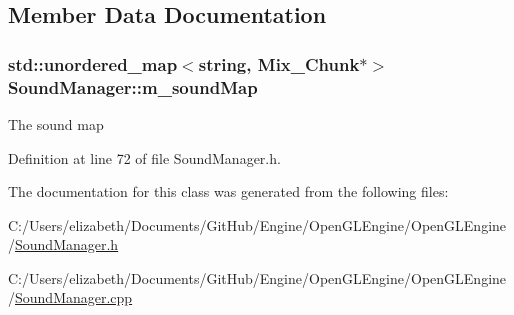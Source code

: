 \subsection{Member Data Documentation}
\subsubsection[{\texorpdfstring{m\+\_\+sound\+Map}{m_soundMap}}]{\setlength{\rightskip}{0pt plus 5cm}std\+::unordered\+\_\+map$<${\bf string}, Mix\+\_\+\+Chunk$\ast$$>$ Sound\+Manager\+::m\+\_\+sound\+Map\hspace{0.3cm}{\ttfamily [private]}}\hypertarget{class_sound_manager_a5780cd0eef57837ec5649aa0cf471224}{}\label{class_sound_manager_a5780cd0eef57837ec5649aa0cf471224}


The sound map 



Definition at line 72 of file Sound\+Manager.\+h.



The documentation for this class was generated from the following files\+:\begin{DoxyCompactItemize}
\item 
C\+:/\+Users/elizabeth/\+Documents/\+Git\+Hub/\+Engine/\+Open\+G\+L\+Engine/\+Open\+G\+L\+Engine/\hyperlink{_sound_manager_8h}{Sound\+Manager.\+h}\item 
C\+:/\+Users/elizabeth/\+Documents/\+Git\+Hub/\+Engine/\+Open\+G\+L\+Engine/\+Open\+G\+L\+Engine/\hyperlink{_sound_manager_8cpp}{Sound\+Manager.\+cpp}\end{DoxyCompactItemize}
